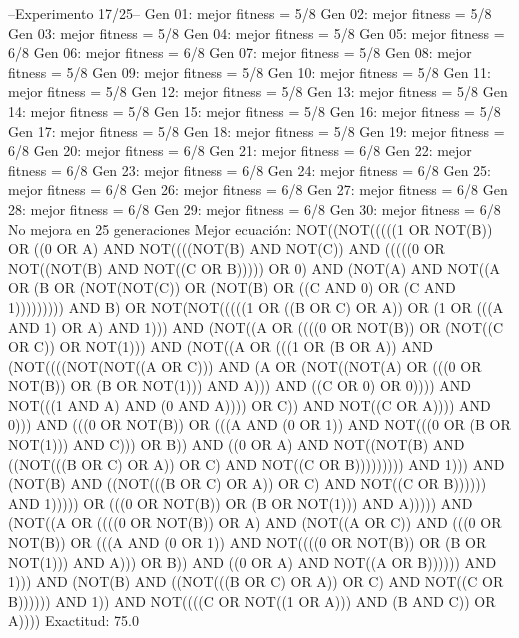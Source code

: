 --Experimento 
 17/25--
Gen 01: mejor fitness = 5/8
Gen 02: mejor fitness = 5/8
Gen 03: mejor fitness = 5/8
Gen 04: mejor fitness = 5/8
Gen 05: mejor fitness = 6/8
Gen 06: mejor fitness = 6/8
Gen 07: mejor fitness = 5/8
Gen 08: mejor fitness = 5/8
Gen 09: mejor fitness = 5/8
Gen 10: mejor fitness = 5/8
Gen 11: mejor fitness = 5/8
Gen 12: mejor fitness = 5/8
Gen 13: mejor fitness = 5/8
Gen 14: mejor fitness = 5/8
Gen 15: mejor fitness = 5/8
Gen 16: mejor fitness = 5/8
Gen 17: mejor fitness = 5/8
Gen 18: mejor fitness = 5/8
Gen 19: mejor fitness = 6/8
Gen 20: mejor fitness = 6/8
Gen 21: mejor fitness = 6/8
Gen 22: mejor fitness = 6/8
Gen 23: mejor fitness = 6/8
Gen 24: mejor fitness = 6/8
Gen 25: mejor fitness = 6/8
Gen 26: mejor fitness = 6/8
Gen 27: mejor fitness = 6/8
Gen 28: mejor fitness = 6/8
Gen 29: mejor fitness = 6/8
Gen 30: mejor fitness = 6/8
No mejora en 25 generaciones
Mejor ecuación: NOT((NOT(((((1 OR NOT(B)) OR ((0 OR A) AND NOT((((NOT(B) AND NOT(C)) AND (((((0 OR NOT((NOT(B) AND NOT((C OR B))))) OR 0) AND (NOT(A) AND NOT((A OR (B OR (NOT(NOT(C)) OR (NOT(B) OR ((C AND 0) OR (C AND 1))))))))) AND B) OR NOT(NOT(((((1 OR ((B OR C) OR A)) OR (1 OR (((A AND 1) OR A) AND 1))) AND (NOT((A OR ((((0 OR NOT(B)) OR (NOT((C OR C)) OR NOT(1))) AND (NOT((A OR (((1 OR (B OR A)) AND (NOT((((NOT(NOT((A OR C))) AND (A OR (NOT((NOT(A) OR (((0 OR NOT(B)) OR (B OR NOT(1))) AND A))) AND ((C OR 0) OR 0)))) AND NOT(((1 AND A) AND (0 AND A)))) OR C)) AND NOT((C OR A)))) AND 0))) AND (((0 OR NOT(B)) OR (((A AND (0 OR 1)) AND NOT(((0 OR (B OR NOT(1))) AND C))) OR B)) AND ((0 OR A) AND NOT((NOT(B) AND ((NOT(((B OR C) OR A)) OR C) AND NOT((C OR B))))))))) AND 1))) AND (NOT(B) AND ((NOT(((B OR C) OR A)) OR C) AND NOT((C OR B)))))) AND 1))))) OR (((0 OR NOT(B)) OR (B OR NOT(1))) AND A))))) AND (NOT((A OR ((((0 OR NOT(B)) OR A) AND (NOT((A OR C)) AND (((0 OR NOT(B)) OR (((A AND (0 OR 1)) AND NOT((((0 OR NOT(B)) OR (B OR NOT(1))) AND A))) OR B)) AND ((0 OR A) AND NOT((A OR B)))))) AND 1))) AND (NOT(B) AND ((NOT(((B OR C) OR A)) OR C) AND NOT((C OR B)))))) AND 1)) AND NOT((((C OR NOT((1 OR A))) AND (B AND C)) OR A))))
 Exactitud: 75.0%

